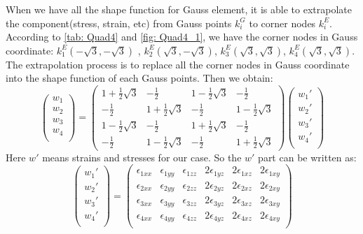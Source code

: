 When we have all the shape function for Gauss element, it is able to extrapolate the component(stress, strain, etc) from Gauss points $k_i^G$ to corner nodes $k_i^E$. According to \ref{tab: Quad4} and \ref{fig: Quad4_1}, we have the corner nodes in Gauss coordinate: $k_1^E(-\sqrt{3}, -\sqrt{3})$ , $k_2^E(\sqrt{3}, -\sqrt{3})$, $k_3^E(\sqrt{3}, \sqrt{3})$, $k_4^E(\sqrt{3}, \sqrt{3})$. The extrapolation process is to replace all the corner nodes in Gauss coordinate into the shape function of each Gauss points. Then we obtain:
\begin{equation}
\begin{pmatrix}
w_1 \\
w_2 \\
w_3 \\
w_4 \\
\end{pmatrix} = \begin{pmatrix}
1 + \frac{1}{2} \sqrt{3} & -\frac{1}{2} &  1 - \frac{1}{2} \sqrt{3} &  -\frac{1}{2}       \\[0.3em]
-\frac{1}{2} & 1 + \frac{1}{2} \sqrt{3} & -\frac{1}{2} &  1 - \frac{1}{2} \sqrt{3}            \\[0.3em]
1 - \frac{1}{2} \sqrt{3} & -\frac{1}{2}  & 1 + \frac{1}{2} \sqrt{3} &  -\frac{1}{2}         \\[0.3em]
-\frac{1}{2} &  1 - \frac{1}{2} \sqrt{3} & -\frac{1}{2} &   1 + \frac{1}{2} \sqrt{3}                             
\end{pmatrix} \begin{pmatrix}
{w_1}' \\
{w_2}' \\
{w_3}' \\
{w_4}' \\
\end{pmatrix}
\end{equation}	
Here $w'$ means strains and stresses for our case. So the $w'$ part can be written as:
\begin{equation}
\begin{pmatrix}
{w_1}' \\
{w_2}' \\
{w_3}' \\
{w_4}' \\
\end{pmatrix} = \begin{pmatrix}
\epsilon_{1xx} & \epsilon_{1yy} & \epsilon_{1zz} & 2\epsilon_{1yz} & 2\epsilon_{1xz} & 2\epsilon_{1xy}   \\
\epsilon_{2xx} & \epsilon_{2yy} & \epsilon_{2zz} & 2\epsilon_{2yz} & 2\epsilon_{2xz} & 2\epsilon_{2xy}   \\
\epsilon_{3xx} & \epsilon_{3yy} & \epsilon_{3zz} & 2\epsilon_{3yz} & 2\epsilon_{3xz} & 2\epsilon_{3xy}   \\
\epsilon_{4xx} & \epsilon_{4yy} & \epsilon_{4zz} & 2\epsilon_{4yz} & 2\epsilon_{4xz} & 2\epsilon_{4xy}   \\
\end{pmatrix}
\end{equation}

